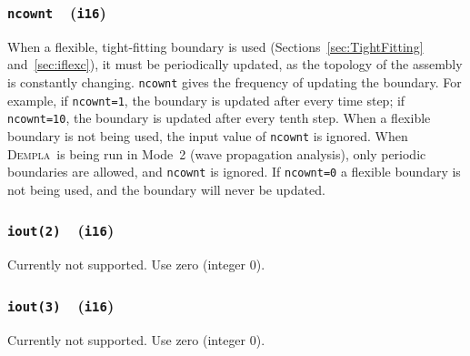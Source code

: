 \documentclass[letterpaper,11pt]{article}
\newcommand{\Dempla}{\textsc{Dempla}}
\newcommand{\Var}[2]{\texttt{#1}\ \  (\texttt{#2})}
\begin{document}
\subsubsection[\texttt{ncownt}]{\Var{ncownt}{i16}}
When a flexible, tight-fitting boundary is used 
(Sections~\ref{sec:TightFitting} and~\ref{sec:iflexc}), it must be periodically
updated, as the topology of the assembly is constantly changing. 
\texttt{ncownt} gives the frequency of updating the boundary.
For example, if \texttt{ncownt=1}, the boundary is updated after
every time step; if \texttt{ncownt=10},  the boundary is updated after
every tenth step.
When a flexible boundary is not being used, the input value of
\texttt{ncownt} is ignored.
When \Dempla\ is being run in Mode~2
(wave propagation analysis), only periodic boundaries are allowed,
and \texttt{ncownt} is ignored.
If \texttt{ncownt=0} a flexible boundary is not being used, 
and the boundary will never be updated.
%
\subsubsection[\texttt{iout(2)}]{\Var{iout(2)}{i16}}
Currently not supported.
Use zero (integer 0).

\subsubsection[\texttt{iout(3)}]{\Var{iout(3)}{i16}}
Currently not supported.
Use zero (integer 0).
%
\end{document}
